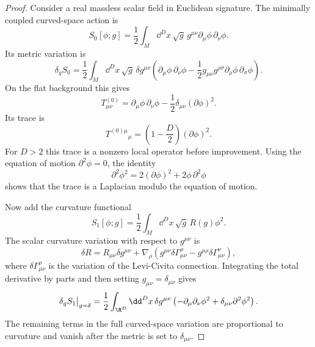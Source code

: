 \begin{proof}
Consider a real massless scalar field in Euclidean signature.  The minimally
coupled curved-space action is
\[
  S_0[\phi;g]
  =
  \frac12\int_M\dd^D x\,\sqrt g\,
  g^{\mu\nu}\partial_\mu\phi\,\partial_\nu\phi .
\]
Its metric variation is
\[
  \delta_g S_0
  =
  \frac12\int_M\dd^Dx\,\sqrt g\,
  \delta g^{\mu\nu}
  \left(
  \partial_\mu\phi\,\partial_\nu\phi
  -
  \frac12g_{\mu\nu}g^{\rho\sigma}
  \partial_\rho\phi\,\partial_\sigma\phi
  \right).
\]
On the flat background this gives
\[
  T_{\mu\nu}^{(0)}
  =
  \partial_\mu\phi\,\partial_\nu\phi
  -
  \frac12\delta_{\mu\nu}(\partial\phi)^2 .
\]
Its trace is
\[
  T^{(0)\mu}{}_\mu
  =
  \left(1-\frac D2\right)(\partial\phi)^2 .
\]
For \(D>2\) this trace is a nonzero local operator before improvement.  Using
the equation of motion \(\partial^2\phi=0\), the identity
\[
  \partial^2\phi^2
  =
  2(\partial\phi)^2+2\phi\,\partial^2\phi
\]
shows that the trace is a Laplacian modulo the equation of motion.

Now add the curvature functional
\[
  S_1[\phi;g]
  =
  \frac12\int_M\dd^Dx\,\sqrt g\,R(g)\phi^2 .
\]
The scalar curvature variation with respect to \(g^{\mu\nu}\) is
\[
  \delta R
  =
  R_{\mu\nu}\delta g^{\mu\nu}
  +
  \nabla_\rho
  \left(
  g^{\mu\nu}\delta\Gamma^\rho_{\mu\nu}
  -
  g^{\mu\rho}\delta\Gamma^\nu_{\mu\nu}
  \right),
\]
where \(\delta\Gamma^\rho_{\mu\nu}\) is the variation of the Levi-Civita
connection.  Integrating the total derivative by parts and then setting
\(g_{\mu\nu}=\delta_{\mu\nu}\) gives
\[
  \delta_g S_1\big|_{g=\delta}
  =
  \frac12\int_{\R^D}\dd^Dx\,\delta g^{\mu\nu}
  \left(
  -\partial_\mu\partial_\nu\phi^2
  +
  \delta_{\mu\nu}\partial^2\phi^2
  \right).
\]
The remaining terms in the full curved-space variation are proportional to
curvature and vanish after the metric is set to \(\delta_{\mu\nu}\).


\end{proof}
